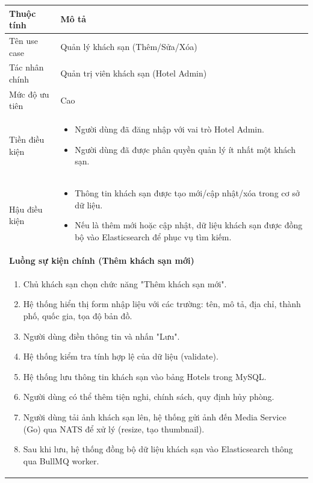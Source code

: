 \documentclass[13pt,a4paper,twoside]{report}
\begin{document}
\begin{longtable}{p{3.5cm} p{11.5cm}}
  \toprule
  \textbf{Thuộc tính} & \textbf{Mô tả} \\
  \midrule
  Tên use case & Quản lý khách sạn (Thêm/Sửa/Xóa) \\
  Tác nhân chính & Quản trị viên khách sạn (Hotel Admin) \\
  Mức độ ưu tiên & Cao \\
  \midrule
  Tiền điều kiện &
  \begin{itemize}[nosep]
    \item Người dùng đã đăng nhập với vai trò Hotel Admin.
    \item Người dùng đã được phân quyền quản lý ít nhất một khách sạn.
  \end{itemize} \\
  \midrule
  Hậu điều kiện &
  \begin{itemize}[nosep]
    \item Thông tin khách sạn được tạo mới/cập nhật/xóa trong cơ sở dữ liệu.
    \item Nếu là thêm mới hoặc cập nhật, dữ liệu khách sạn được đồng bộ vào Elasticsearch để phục vụ tìm kiếm.
  \end{itemize} \\
  \midrule
  \multicolumn{2}{p{15cm}}{\textbf{Luồng sự kiện chính (Thêm khách sạn mới)}} \\
  \midrule
  \multicolumn{2}{p{15cm}}{%
    \begin{enumerate}[nosep]
      \item Chủ khách sạn chọn chức năng "Thêm khách sạn mới".
      \item Hệ thống hiển thị form nhập liệu với các trường: tên, mô tả, địa chỉ, thành phố, quốc gia, tọa độ bản đồ.
      \item Người dùng điền thông tin và nhấn "Lưu".
      \item Hệ thống kiểm tra tính hợp lệ của dữ liệu (validate).
      \item Hệ thống lưu thông tin khách sạn vào bảng Hotels trong MySQL.
      \item Người dùng có thể thêm tiện nghi, chính sách, quy định hủy phòng.
      \item Người dùng tải ảnh khách sạn lên, hệ thống gửi ảnh đến Media Service (Go) qua NATS để xử lý (resize, tạo thumbnail).
      \item Sau khi lưu, hệ thống đồng bộ dữ liệu khách sạn vào Elasticsearch thông qua BullMQ worker.
    \end{enumerate}
}
\end{longtable}
\end{document}
